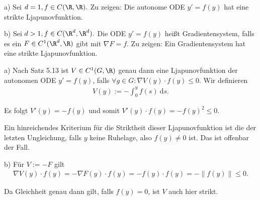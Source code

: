 \begin{exercise}
  a) Sei $d = 1, f \in C(\R, \R).$ Zu zeigen: Die autonome ODE $y' = f(y)$ hat eine strikte Ljapunovfunktion.

  b) Sei $d > 1, f \in C(\R^d, \R^d).$ Die ODE $y' = f(y)$ heißt Gradientensystem, falls es ein $F \in C^1(\R^d, \R)$ gibt mit $\nabla F = f$. Zu zeigen: Ein Gradientensystem hat eine strikte Ljapunovfunktion.
\end{exercise}

\begin{solution}
  a) Nach Satz 5.13 ist $V \in C^1(G, \R)$ genau dann eine Ljapunovfunktion der autonomen ODE $y' = f(y)$, falls $\forall g \in G: \nabla V(y) \cdot f(y) \leq 0$. Wir definieren
  \begin{align}
      V(y) := -\int_0^y f(s)~ \mathrm{d}s.
  \end{align}

  Es folgt $V'(y) = -f(y)$ und somit $V'(y) \cdot f(y) = -f(y)^2 \leq 0.$

  Ein hinreichendes Kriterium für die Striktheit dieser Ljapunovfunktion ist die der letzten Ungleichung, falls $y$ keine Ruhelage, also $f(y) \neq 0$ ist. Das ist offenbar der Fall.

  b) Für $V := -F$ gilt
  \begin{align}
      \nabla V(y) \cdot f(y) = - \nabla F(y) \cdot f(y) = - f(y) \cdot f(y) = - \| f(y) \| \leq 0.
  \end{align}

  Da Gleichheit genau dann gilt, falls $f(y) = 0$, ist $V$ auch hier strikt.
\end{solution}
